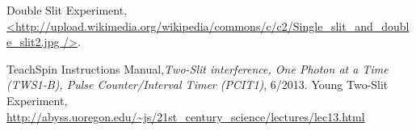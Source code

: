 \documentclass[prb,preprint]{revtex4-1}
\begin{document}
\begin{thebibliography}{99}

 Double Slit Experiment, \url{<http://upload.wikimedia.org/wikipedia/commons/c/c2/Single_slit_and_double_slit2.jpg
/>}.

 TeachSpin Instructions Manual,\textit{Two-Slit interference, One Photon at a Time (TWS1-B), Pulse Counter/Interval Timer (PCIT1)}, 6/2013.
 Young Two-Slit Experiment, \url{http://abyss.uoregon.edu/~js/21st_century_science/lectures/lec13.html}

\end{thebibliography}

\end{document}
